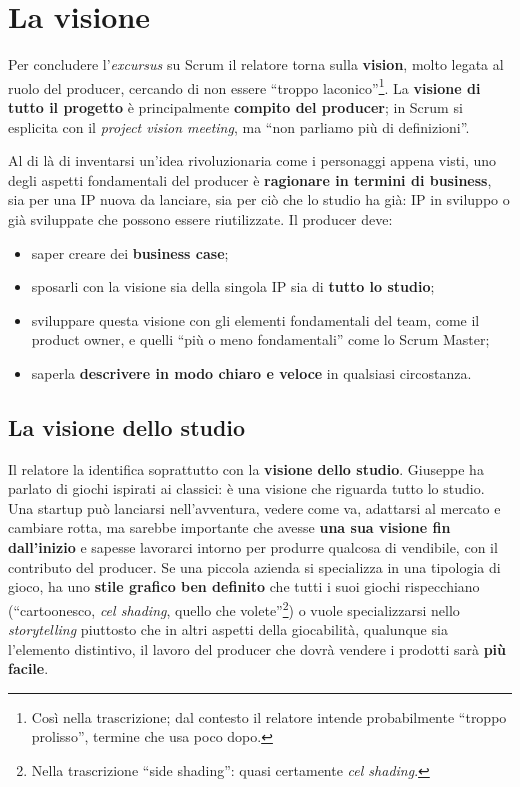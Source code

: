 \section{La visione}
\label{sec:z5-visione}

Per concludere l'\emph{excursus} su Scrum il relatore torna sulla
\textbf{vision}, molto legata al ruolo del producer, cercando di non essere
``troppo laconico''\footnote{Così nella trascrizione; dal contesto il relatore
intende probabilmente ``troppo prolisso'', termine che usa poco dopo.}. La
\textbf{visione di tutto il progetto} è principalmente \textbf{compito del
producer}; in Scrum si esplicita con il \emph{project vision meeting}, ma
``non parliamo più di definizioni''.

Al di là di inventarsi un'idea rivoluzionaria come i personaggi appena visti,
uno degli aspetti fondamentali del producer è \textbf{ragionare in termini di
business}, sia per una IP nuova da lanciare, sia per ciò che lo studio ha già:
IP in sviluppo o già sviluppate che possono essere riutilizzate. Il producer
deve:
\begin{itemize}
  \item saper creare dei \textbf{business case};
  \item sposarli con la visione sia della singola IP sia di \textbf{tutto lo
        studio};
  \item sviluppare questa visione con gli elementi fondamentali del team, come il
        product owner, e quelli ``più o meno fondamentali'' come lo Scrum Master;
  \item saperla \textbf{descrivere in modo chiaro e veloce} in qualsiasi
        circostanza.
\end{itemize}

\subsection{La visione dello studio}

Il relatore la identifica soprattutto con la \textbf{visione dello studio}.
Giuseppe ha parlato di giochi ispirati ai classici: è una visione che riguarda
tutto lo studio. Una startup può lanciarsi nell'avventura, vedere come va,
adattarsi al mercato e cambiare rotta, ma sarebbe importante che avesse
\textbf{una sua visione fin dall'inizio} e sapesse lavorarci intorno per produrre
qualcosa di vendibile, con il contributo del producer. Se una piccola azienda si
specializza in una tipologia di gioco, ha uno \textbf{stile grafico ben
definito} che tutti i suoi giochi rispecchiano (``cartoonesco, \emph{cel
shading}, quello che volete''\footnote{Nella trascrizione ``side shading'':
quasi certamente \emph{cel shading}.}) o vuole specializzarsi nello
\emph{storytelling} piuttosto che in altri aspetti della giocabilità, qualunque
sia l'elemento distintivo, il lavoro del producer che dovrà vendere i prodotti
sarà \textbf{più facile}.

